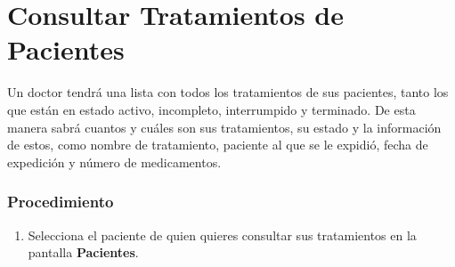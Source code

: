 \section{Consultar Tratamientos de Pacientes}

Un doctor tendrá una lista con todos los tratamientos de sus pacientes, tanto los que están en estado activo, incompleto, interrumpido y terminado. De esta manera sabrá cuantos y cuáles son sus tratamientos, su estado y la información de estos, como nombre de tratamiento, paciente al que se le expidió, fecha de expedición y número de medicamentos.

\subsubsection{Procedimiento}
\begin{enumerate}
	
	\item Selecciona el paciente de quien quieres consultar sus tratamientos en la pantalla \textbf{Pacientes}.
	

\end{enumerate}
